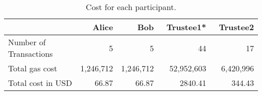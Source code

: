 
\begin{table}[t]
		\centering
	\begin{tabular}{|l|r|r|r|r|}
		\hline
		& ~\textbf{Alice} &  ~\textbf{Bob} & ~\textbf{Trustee1*}  & ~\textbf{Trustee2}  \\ \hline
		Number of Transactions	& 5 &5  &44  &17  \\ \hline
		Total gas cost	& 1,246,712 &  1,246,712& 52,952,603  & 6,420,996 \\ \hline
		Total cost in USD	&  66.87& 66.87 &2840.41  & 344.43 \\ \hline
	\end{tabular}
	\caption{Cost for each participant.} 
	\label{tab:participantcost}
\end{table}